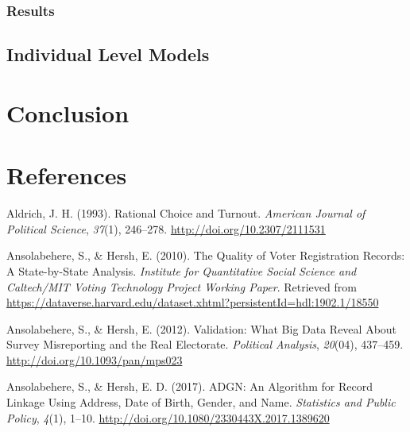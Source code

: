 \documentclass[12pt,twoside]{reedthesis}
\begin{document}
  \subsection{Results}\label{results}
  
  \section{Individual Level Models}\label{individual-level-models}
  
  \chapter*{Conclusion}\label{conclusion}
  
  \setcounter{chapter}{4} \setcounter{section}{0}
  
  \appendix
  
  \backmatter
  
  \chapter{References}\label{references}
  
  \noindent
  
  \setlength{\parindent}{-0.20in} \setlength{\leftskip}{0.20in}
  \setlength{\parskip}{8pt}
  
  \hypertarget{refs}{}
  \hypertarget{ref-aldrich_rational_1993}{}
  Aldrich, J. H. (1993). Rational Choice and Turnout. \emph{American
  Journal of Political Science}, \emph{37}(1), 246--278.
  \url{http://doi.org/10.2307/2111531}
  
  \hypertarget{ref-ansolabehere_quality_2010}{}
  Ansolabehere, S., \& Hersh, E. (2010). The Quality of Voter Registration
  Records: A State-by-State Analysis. \emph{Institute for Quantitative
  Social Science and Caltech/MIT Voting Technology Project Working Paper}.
  Retrieved from
  \url{https://dataverse.harvard.edu/dataset.xhtml?persistentId=hdl:1902.1/18550}
  
  \hypertarget{ref-ansolabehere_validation:_2012}{}
  Ansolabehere, S., \& Hersh, E. (2012). Validation: What Big Data Reveal
  About Survey Misreporting and the Real Electorate. \emph{Political
  Analysis}, \emph{20}(04), 437--459.
  \url{http://doi.org/10.1093/pan/mps023}
  
  \hypertarget{ref-ansolabehere_adgn:_2017}{}
  Ansolabehere, S., \& Hersh, E. D. (2017). ADGN: An Algorithm for Record
  Linkage Using Address, Date of Birth, Gender, and Name. \emph{Statistics
  and Public Policy}, \emph{4}(1), 1--10.
  \url{http://doi.org/10.1080/2330443X.2017.1389620}
  
\end{document}
